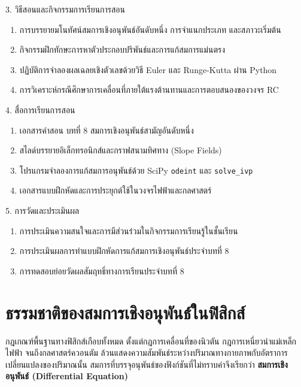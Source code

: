 \newpage

\begin{planbox}[colframe=rbruNavy!85!black, colbacktitle=rbruNavy!85!black]{3. วิธีสอนและกิจกรรมการเรียนการสอน}
\begin{enumerate}[topsep=2pt, itemsep=1pt, partopsep=0pt, parsep=0pt, leftmargin=1.5em]
    \item การบรรยายมโนทัศน์สมการเชิงอนุพันธ์อันดับหนึ่ง การจำแนกประเภท และสภาวะเริ่มต้น
    \item กิจกรรมฝึกทักษะการหาตัวประกอบปริพันธ์และการแก้สมการแม่นตรง
    \item ปฏิบัติการจำลองผลเฉลยเชิงตัวเลขด้วยวิธี Euler และ Runge-Kutta ผ่าน Python
    \item การวิเคราะห์กรณีศึกษาการเคลื่อนที่ภายใต้แรงต้านทานและการตอบสนองของวงจร RC
\end{enumerate}
\end{planbox}

\begin{planbox}[colframe=rbruGold!90!black, colbacktitle=rbruGold!90!black]{4. สื่อการเรียนการสอน}
\begin{enumerate}[topsep=2pt, itemsep=1pt, partopsep=0pt, parsep=0pt, leftmargin=1.5em]
    \item เอกสารคำสอน บทที่ 8 สมการเชิงอนุพันธ์สามัญอันดับหนึ่ง
    \item สไลด์บรรยายอิเล็กทรอนิกส์และกราฟสนามทิศทาง (Slope Fields)
    \item โปรแกรมจำลองการแก้สมการอนุพันธ์ด้วย SciPy \texttt{odeint} และ \texttt{solve\_ivp}
    \item เอกสารแบบฝึกหัดและการประยุกต์ใช้ในวงจรไฟฟ้าและกลศาสตร์
\end{enumerate}
\end{planbox}

\begin{planbox}[colframe=rbruSlate, colbacktitle=rbruSlate]{5. การวัดและประเมินผล}
\begin{enumerate}[topsep=2pt, itemsep=1pt, partopsep=0pt, parsep=0pt, leftmargin=1.5em]
    \item การประเมินความสนใจและการมีส่วนร่วมในกิจกรรมการเรียนรู้ในชั้นเรียน
    \item การประเมินผลการทำแบบฝึกหัดการแก้สมการเชิงอนุพันธ์ประจำบทที่ 8
    \item การทดสอบย่อยวัดผลสัมฤทธิ์ทางการเรียนประจำบทที่ 8
\end{enumerate}
\end{planbox}
\clearpage

\section{ธรรมชาติของสมการเชิงอนุพันธ์ในฟิสิกส์}
กฎเกณฑ์พื้นฐานทางฟิสิกส์เกือบทั้งหมด ตั้งแต่กฎการเคลื่อนที่ของนิวตัน กฎการเหนี่ยวนำแม่เหล็กไฟฟ้า จนถึงกลศาสตร์ควอนตัม ล้วนแสดงความสัมพันธ์ระหว่างปริมาณทางกายภาพกับอัตราการเปลี่ยนแปลงของปริมาณนั้น สมการที่บรรจุอนุพันธ์ของฟังก์ชันที่ไม่ทราบค่าจึงเรียกว่า \textbf{สมการเชิงอนุพันธ์ (Differential Equation)}

